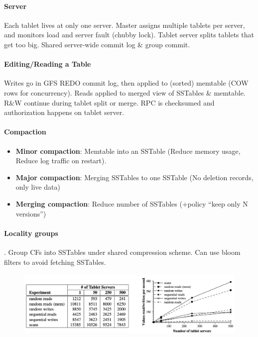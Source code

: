 \paragraph{Server} Each tablet lives at only one server. Master assigns multiple
tablets per server, and monitors load and server fault (chubby lock). Tablet
server splits tablets that get too big. Shared server-wide commit log \& group
commit.

\paragraph{Editing/Reading a Table} Writes go in GFS REDO commit log, then
applied to (sorted) memtable (COW rows for concurrency). Reads applied to merged
view of SSTables \& memtable. R\&W continue during tablet split or merge. RPC is
checksumed and authorization happens on tablet server.

\paragraph{Compaction}
\begin{itemize}
\item \textbf{Minor compaction}: Memtable into an SSTable (Reduce memory usage,
  Reduce log traffic on restart).
\item \textbf{Major compaction}: Merging SSTables to one SSTable (No deletion
  records, only live data)
\item \textbf{Merging compaction}: Reduce number of SSTables (+policy “keep only
  N versions”)
\end{itemize}

\paragraph{Locality groups}. Group CFs into SSTables under shared compression
scheme. Can use bloom filters to avoid fetching SSTables.

\begin{figure}[h]
  \centering
  \includegraphics[width=0.95\linewidth]{img/bt-bench.png}
\end{figure}